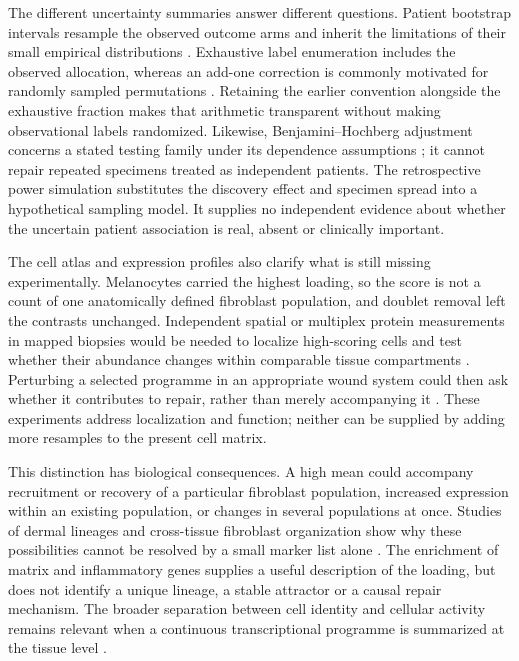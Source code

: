 \documentclass[10pt,a4paper]{article}
\begin{document}
The different uncertainty summaries answer different questions. Patient bootstrap intervals resample the observed outcome arms and inherit the limitations of their small empirical distributions \citep{efron1993}. Exhaustive label enumeration includes the observed allocation, whereas an add-one correction is commonly motivated for randomly sampled permutations \citep{phipson2010,hemerik2018}. Retaining the earlier convention alongside the exhaustive fraction makes that arithmetic transparent without making observational labels randomized. Likewise, Benjamini--Hochberg adjustment concerns a stated testing family under its dependence assumptions \citep{benjamini1995}; it cannot repair repeated specimens treated as independent patients. The retrospective power simulation substitutes the discovery effect and specimen spread into a hypothetical sampling model. It supplies no independent evidence about whether the uncertain patient association is real, absent or clinically important.

The cell atlas and expression profiles also clarify what is still missing experimentally. Melanocytes carried the highest loading, so the score is not a count of one anatomically defined fibroblast population, and doublet removal left the contrasts unchanged. Independent spatial or multiplex protein measurements in mapped biopsies would be needed to localize high-scoring cells and test whether their abundance changes within comparable tissue compartments \citep{foster2021,philippeos2018}. Perturbing a selected programme in an appropriate wound system could then ask whether it contributes to repair, rather than merely accompanying it \citep{mascharak2021}. These experiments address localization and function; neither can be supplied by adding more resamples to the present cell matrix.

This distinction has biological consequences. A high mean could accompany recruitment or recovery of a particular fibroblast population, increased expression within an existing population, or changes in several populations at once. Studies of dermal lineages and cross-tissue fibroblast organization show why these possibilities cannot be resolved by a small marker list alone \citep{driskell2013,muhl2020,buechler2021}. The enrichment of matrix and inflammatory genes supplies a useful description of the loading, but does not identify a unique lineage, a stable attractor or a causal repair mechanism. The broader separation between cell identity and cellular activity remains relevant when a continuous transcriptional programme is summarized at the tissue level \citep{kotliar2019}.
\end{document}
